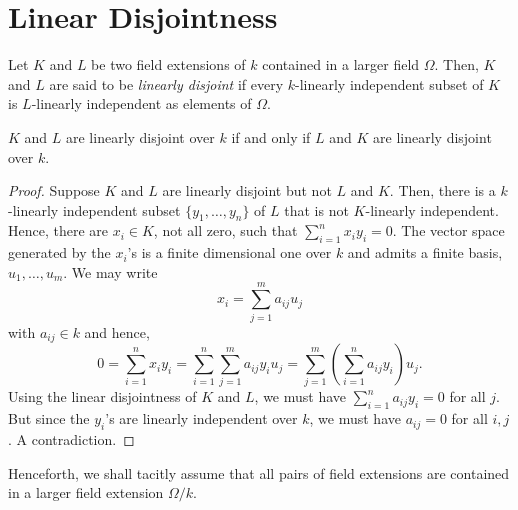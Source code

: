 \section{Linear Disjointness}

\begin{definition}
    Let $K$ and $L$ be two field extensions of $k$ contained in a larger field $\Omega$. Then, $K$ and $L$ are said to be \emph{linearly disjoint} if every $k$-linearly independent subset of $K$ is $L$-linearly independent as elements of $\Omega$.
\end{definition}

\begin{proposition}
    $K$ and $L$ are linearly disjoint over $k$ if and only if $L$ and $K$ are linearly disjoint over $k$.
\end{proposition}
\begin{proof}
    Suppose $K$ and $L$ are linearly disjoint but not $L$ and $K$. Then, there is a $k$-linearly independent subset $\{y_1,\dots,y_n\}$ of $L$ that is not $K$-linearly independent. Hence, there are $x_i\in K$, not all zero, such that $\sum_{i = 1}^n x_iy_i = 0$. The vector space generated by the $x_i$'s is a finite dimensional one over $k$ and admits a finite basis, $u_1,\dots,u_m$. We may write 
    \begin{equation*}
        x_i = \sum_{j = 1}^m a_{ij}u_j
    \end{equation*}
    with $a_{ij}\in k$ and hence, 
    \begin{equation*}
        0 = \sum_{i = 1}^n x_iy_i = \sum_{i = 1}^n\sum_{j = 1}^m a_{ij}y_iu_j = \sum_{j = 1}^m\left(\sum_{i = 1}^n a_{ij}y_i\right)u_j.
    \end{equation*}
    Using the linear disjointness of $K$ and $L$, we must have $\sum_{i = 1}^n a_{ij}y_i = 0$ for all $j$. But since the $y_i$'s are linearly independent over $k$, we must have $a_{ij} = 0$ for all $i,j$. A contradiction.
\end{proof}

Henceforth, we shall tacitly assume that all pairs of field extensions are contained in a larger field extension $\Omega/k$.

